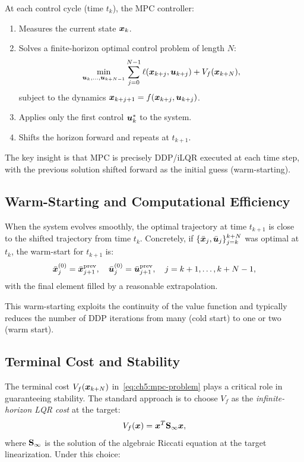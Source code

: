 At each control cycle (time $t_k$), the MPC controller:
\begin{enumerate}
\item Measures the current state $\bm{x}_k$.
\item Solves a finite-horizon optimal control problem of length $N$:
\begin{equation}
\min_{\bm{u}_k, \ldots, \bm{u}_{k+N-1}} \sum_{j=0}^{N-1} \ell(\bm{x}_{k+j}, \bm{u}_{k+j})
+ V_f(\bm{x}_{k+N}),
\label{eq:ch5:mpc-problem}
\end{equation}
subject to the dynamics $\bm{x}_{k+j+1} = f(\bm{x}_{k+j}, \bm{u}_{k+j})$.
\item Applies only the first control $\bm{u}_k^*$ to the system.
\item Shifts the horizon forward and repeats at $t_{k+1}$.
\end{enumerate}

The key insight is that MPC is precisely DDP/iLQR executed at each time step, with the
previous solution shifted forward as the initial guess (warm-starting).

\subsection{Warm-Starting and Computational Efficiency}

When the system evolves smoothly, the optimal trajectory at time $t_{k+1}$ is close to
the shifted trajectory from time $t_k$. Concretely, if $\{\bar{\bm{x}}_j, \bar{\bm{u}}_j\}_{j=k}^{k+N}$
was optimal at $t_k$, the warm-start for $t_{k+1}$ is:
\begin{equation}
\bar{\bm{x}}_j^{(0)} = \bar{\bm{x}}_{j+1}^{\text{prev}}, \quad
\bar{\bm{u}}_j^{(0)} = \bar{\bm{u}}_{j+1}^{\text{prev}}, \quad j = k+1, \ldots, k+N-1,
\label{eq:ch5:warm-start}
\end{equation}
with the final element filled by a reasonable extrapolation.

This warm-starting exploits the continuity of the value function and typically reduces the
number of DDP iterations from many (cold start) to one or two (warm start).

\subsection{Terminal Cost and Stability}

The terminal cost $V_f(\bm{x}_{k+N})$ in~\eqref{eq:ch5:mpc-problem} plays a critical role
in guaranteeing stability. The standard approach is to choose $V_f$ as the \emph{infinite-horizon
LQR cost} at the target:
\begin{equation}
V_f(\bm{x}) = \bm{x}^T \mathbf{S}_\infty \bm{x},
\label{eq:ch5:terminal-cost}
\end{equation}
where $\mathbf{S}_\infty$ is the solution of the algebraic Riccati equation at the target
linearization. Under this choice:

